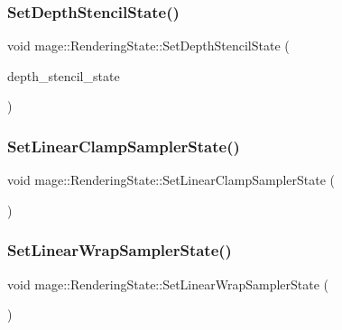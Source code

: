 \hypertarget{structmage_1_1_rendering_state_abd2c63744e29e526e145bcacb3e07867}{}\label{structmage_1_1_rendering_state_abd2c63744e29e526e145bcacb3e07867} 
\subsubsection{\texorpdfstring{Set\+Depth\+Stencil\+State()}{SetDepthStencilState()}}
{\footnotesize\ttfamily void mage\+::\+Rendering\+State\+::\+Set\+Depth\+Stencil\+State (\begin{DoxyParamCaption}\item[{I\+D3\+D11\+Depth\+Stencil\+State $\ast$}]{depth\+\_\+stencil\+\_\+state }\end{DoxyParamCaption})}

\hypertarget{structmage_1_1_rendering_state_a4f414c7bed884194bd93d89f893c86b4}{}\label{structmage_1_1_rendering_state_a4f414c7bed884194bd93d89f893c86b4} 
\subsubsection{\texorpdfstring{Set\+Linear\+Clamp\+Sampler\+State()}{SetLinearClampSamplerState()}}
{\footnotesize\ttfamily void mage\+::\+Rendering\+State\+::\+Set\+Linear\+Clamp\+Sampler\+State (\begin{DoxyParamCaption}{ }\end{DoxyParamCaption})}

\hypertarget{structmage_1_1_rendering_state_a6ffd109271b4988fa6d4a6fc2daa2125}{}\label{structmage_1_1_rendering_state_a6ffd109271b4988fa6d4a6fc2daa2125} 
\subsubsection{\texorpdfstring{Set\+Linear\+Wrap\+Sampler\+State()}{SetLinearWrapSamplerState()}}
{\footnotesize\ttfamily void mage\+::\+Rendering\+State\+::\+Set\+Linear\+Wrap\+Sampler\+State (\begin{DoxyParamCaption}{ }\end{DoxyParamCaption})}


